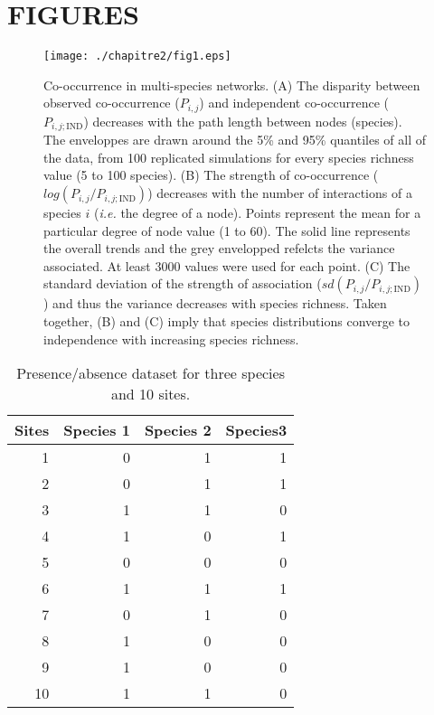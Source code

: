 \newpage

\section{FIGURES}
\begin{figure}[h]
\texttt{[image: ./chapitre2/fig1.eps]}
\caption{Co-occurrence in multi-species networks.
(A) The disparity between observed co-occurrence ($P_{i,j}$) and independent co-occurrence ($P_{i,j;\text{IND}}$) decreases with the path length between nodes (species). The enveloppes are drawn around the 5\% and 95\% quantiles of all of the data, from 100 replicated simulations for every species richness value (5 to 100 species).
(B) The strength of co-occurrence ($log(P_{i,j}/P_{i,j;\text{IND}})$) decreases with the number of interactions of a species $i$ (\textit{i.e.} the degree of a node). Points represent the mean for a particular degree of node value (1 to 60). The solid line represents the overall trends and the grey envelopped refelcts the variance associated. At least 3000 values were used for each point.
(C) The standard deviation of the strength of association ($sd(P_{i,j}/P_{i,j;\text{IND}})$) and thus the variance decreases with species richness. Taken together, (B) and (C) imply that species distributions converge to independence with increasing species richness.}
\label{fig:1}
\end{figure}
%
\newpage

\begin{table}[h]
\centering
\begin{tabular}{r|r|r|r}
  Sites & Species 1 & Species 2 & Species3 \\
  \hline
1 & 0 & 1 & 1\\
2 & 0 & 1 & 1\\
3 & 1 & 1 & 0\\
4 & 1 & 0 & 1\\
5 & 0 & 0 & 0\\
6 & 1 & 1 & 1\\
7 & 0 & 1 & 0\\
8 & 1 & 0 & 0\\
9 & 1 & 0 & 0\\
10 & 1 & 1 & 0\\
  \end{tabular}
\caption{Presence/absence dataset for three species and 10 sites.}
\label{tab:2}
\end{table}



